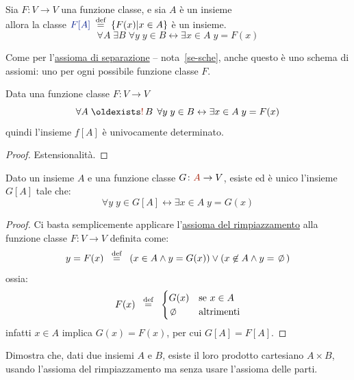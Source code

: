 \begin{axiom}
	\label{ax8}
	Sia $F \colon V \to V$ una funzione classe, e sia $A$ \`e un
insieme\\
allora la classe ${\drkblu F[A]} \;\Mydef\; \{F(x) | x \in A\}$ \`e un insieme.
		\[ \forall A \; \exists B \; \forall y \; y \in B
\leftrightarrow \exists {x \in A} \; y = F(x)
		\]
\end{axiom}

\begin{remark}
Come per l'\href{ax3}{assioma di separazione} -- nota~\ref{se-sche}, anche questo \`e uno schema di
assiomi: uno per ogni possibile funzione classe $F$.
\end{remark}

\begin{proposition}
	Data una funzione classe $F\colon V \to V$
	\[ \forall A \; \existrun B \; \forall y \; y \in B
\leftrightarrow \exists {x \in A} \; y = F(x)
		\]
quindi l'insieme $f[A]$ \`e univocamente determinato.
\end{proposition}

\begin{proof}
	Estensionalit\`a.
\end{proof}

\begin{remark}
	Dato un insieme $A$ e una funzione classe $G \colon {\drkred A} \rightarrow V$, esiste ed \`e unico l'insieme $G[A]$ tale che:
	\[ \forall y \; y \in G[A] \leftrightarrow \exists {x \in A} \; y = G(x)
		\]
\end{remark}

\begin{proof}
	Ci basta semplicemente applicare l'\hyperref[ax8]{assioma del
rimpiazzamento} alla funzione classe $F \colon V \rightarrow V$ definita come:
	\[ y = F(x) \;\;\Mydef\;\; (x \in A \land y = G(x)) \lor (x \not \in A \land y = \emptyset)
		\]
	ossia:
	\[ F(x) \;\;\Mydef\;\; \begin{cases}
		G(x) &\text{se $x \in A$} \\
		\emptyset &\text{altrimenti}
	\end{cases}
		\]
	infatti $x \in A$ implica $G(x) = F(x)$, per cui $G[A] = F[A]$.
\end{proof}

\begin{exercise}
	Dimostra che, dati due insiemi $A$ e $B$, esiste il loro prodotto cartesiano $A \times B$, usando l'assioma del rimpiazzamento ma senza usare l'assioma delle parti.
\end{exercise}

